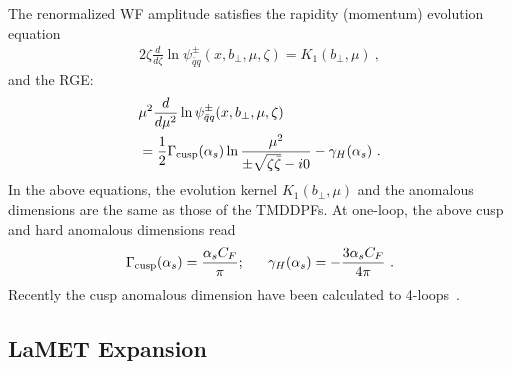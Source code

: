 \documentclass[twocolumn,superscriptaddress,longbibliography,10pt]{revtex4-1}
\begin{document}
The renormalized WF amplitude satisfies the rapidity (momentum) evolution equation
\begin{align}
2\zeta \frac{d}{d\zeta} \ln  \psi^{\pm}_{\bar q q}(x,b_\perp, \mu,\zeta)=K_1(b_\perp,\mu) \ ,
\end{align}
and the RGE:
\begin{align}
&\mu^2\frac{d}{d\mu^2}\ln \psi^{\pm}_{\bar q q}(x,b_\perp, \mu,\zeta)\nonumber \\
&=\frac{1}{2}\Gamma_{\rm cusp}(\alpha_s)\ln \frac{\mu^2}{\pm \sqrt{\zeta \bar \zeta}-i0}-\gamma_{H}(\alpha_s) \ .
\end{align}
In the above equations, the evolution kernel $K_1(b_\perp, \mu)$ and the anomalous dimensions are the same as those of
the TMDDPFs.  At one-loop, the above cusp and hard anomalous dimensions read
\begin{align}\label{eq:ad_hard}
\Gamma_{\rm cusp}(\alpha_s) =\frac{\alpha_s C_F}{\pi}; ~~~~~
\gamma_H(\alpha_s) =-\frac{3\alpha_sC_F}{4\pi}  \ .
\end{align}
Recently the cusp anomalous dimension have been calculated to 4-loops~\cite{Henn:2019swt,vonManteuffel:2020vjv}.

\subsection{LaMET Expansion}
\end{document}

